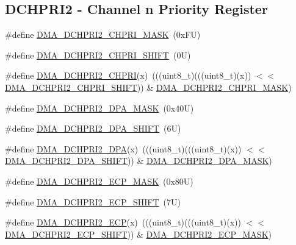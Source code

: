 \subsection*{D\+C\+H\+P\+R\+I2 -\/ Channel n Priority Register}
\begin{DoxyCompactItemize}
\item 
\#define \mbox{\hyperlink{group___d_m_a___register___masks_gaa13f7f19a25ff7ec4c566803d9ab48b8}{D\+M\+A\+\_\+\+D\+C\+H\+P\+R\+I2\+\_\+\+C\+H\+P\+R\+I\+\_\+\+M\+A\+SK}}~(0x\+F\+U)
\item 
\#define \mbox{\hyperlink{group___d_m_a___register___masks_gaf8e134ae4fb5fe5af8e99f78b9e7d958}{D\+M\+A\+\_\+\+D\+C\+H\+P\+R\+I2\+\_\+\+C\+H\+P\+R\+I\+\_\+\+S\+H\+I\+FT}}~(0\+U)
\item 
\#define \mbox{\hyperlink{group___d_m_a___register___masks_gadbc9d1829aeacdc6f53ebc706cbff015}{D\+M\+A\+\_\+\+D\+C\+H\+P\+R\+I2\+\_\+\+C\+H\+P\+RI}}(x)~(((uint8\+\_\+t)(((uint8\+\_\+t)(x)) $<$$<$ \mbox{\hyperlink{group___d_m_a___register___masks_gaf8e134ae4fb5fe5af8e99f78b9e7d958}{D\+M\+A\+\_\+\+D\+C\+H\+P\+R\+I2\+\_\+\+C\+H\+P\+R\+I\+\_\+\+S\+H\+I\+FT}})) \& \mbox{\hyperlink{group___d_m_a___register___masks_gaa13f7f19a25ff7ec4c566803d9ab48b8}{D\+M\+A\+\_\+\+D\+C\+H\+P\+R\+I2\+\_\+\+C\+H\+P\+R\+I\+\_\+\+M\+A\+SK}})
\item 
\#define \mbox{\hyperlink{group___d_m_a___register___masks_gabb7c0ad697d56ee419d906f85515f222}{D\+M\+A\+\_\+\+D\+C\+H\+P\+R\+I2\+\_\+\+D\+P\+A\+\_\+\+M\+A\+SK}}~(0x40\+U)
\item 
\#define \mbox{\hyperlink{group___d_m_a___register___masks_ga1bb0bb4e70fc28664327a789d7b3f174}{D\+M\+A\+\_\+\+D\+C\+H\+P\+R\+I2\+\_\+\+D\+P\+A\+\_\+\+S\+H\+I\+FT}}~(6\+U)
\item 
\#define \mbox{\hyperlink{group___d_m_a___register___masks_ga68759e0471203071fda3fbc54c8d050f}{D\+M\+A\+\_\+\+D\+C\+H\+P\+R\+I2\+\_\+\+D\+PA}}(x)~(((uint8\+\_\+t)(((uint8\+\_\+t)(x)) $<$$<$ \mbox{\hyperlink{group___d_m_a___register___masks_ga1bb0bb4e70fc28664327a789d7b3f174}{D\+M\+A\+\_\+\+D\+C\+H\+P\+R\+I2\+\_\+\+D\+P\+A\+\_\+\+S\+H\+I\+FT}})) \& \mbox{\hyperlink{group___d_m_a___register___masks_gabb7c0ad697d56ee419d906f85515f222}{D\+M\+A\+\_\+\+D\+C\+H\+P\+R\+I2\+\_\+\+D\+P\+A\+\_\+\+M\+A\+SK}})
\item 
\#define \mbox{\hyperlink{group___d_m_a___register___masks_ga5d73d5f6aae29465206f72cda9bccde6}{D\+M\+A\+\_\+\+D\+C\+H\+P\+R\+I2\+\_\+\+E\+C\+P\+\_\+\+M\+A\+SK}}~(0x80\+U)
\item 
\#define \mbox{\hyperlink{group___d_m_a___register___masks_ga139a8b64a74b8009c858a68687a388aa}{D\+M\+A\+\_\+\+D\+C\+H\+P\+R\+I2\+\_\+\+E\+C\+P\+\_\+\+S\+H\+I\+FT}}~(7\+U)
\item 
\#define \mbox{\hyperlink{group___d_m_a___register___masks_gaef33fef078d0f5ec8a9517628b47b23d}{D\+M\+A\+\_\+\+D\+C\+H\+P\+R\+I2\+\_\+\+E\+CP}}(x)~(((uint8\+\_\+t)(((uint8\+\_\+t)(x)) $<$$<$ \mbox{\hyperlink{group___d_m_a___register___masks_ga139a8b64a74b8009c858a68687a388aa}{D\+M\+A\+\_\+\+D\+C\+H\+P\+R\+I2\+\_\+\+E\+C\+P\+\_\+\+S\+H\+I\+FT}})) \& \mbox{\hyperlink{group___d_m_a___register___masks_ga5d73d5f6aae29465206f72cda9bccde6}{D\+M\+A\+\_\+\+D\+C\+H\+P\+R\+I2\+\_\+\+E\+C\+P\+\_\+\+M\+A\+SK}})
\end{DoxyCompactItemize}
